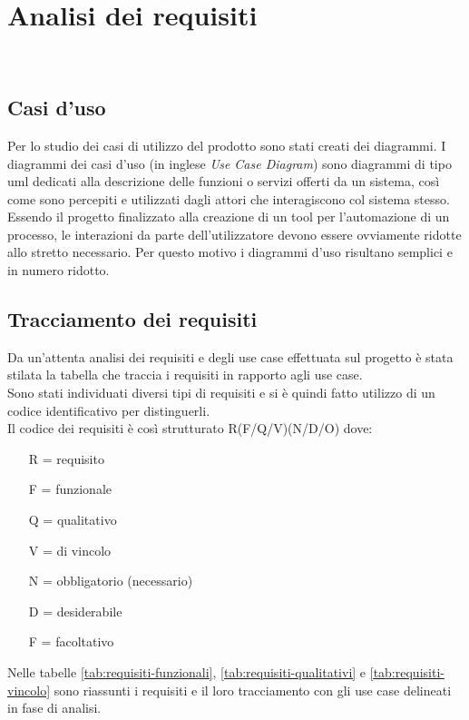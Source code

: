 
\chapter{Analisi dei requisiti}
\label{cap:analisi-requisiti}

\\

\section{Casi d'uso}

Per lo studio dei casi di utilizzo del prodotto sono stati creati dei diagrammi.
I diagrammi dei casi d'uso (in inglese \emph{Use Case Diagram}) sono diagrammi di tipo \gls{uml} dedicati alla descrizione delle funzioni o servizi offerti da un sistema, così come sono percepiti e utilizzati dagli attori che interagiscono col sistema stesso.
Essendo il progetto finalizzato alla creazione di un tool per l'automazione di un processo, le interazioni da parte dell'utilizzatore devono essere ovviamente ridotte allo stretto necessario. Per questo motivo i diagrammi d'uso risultano semplici e in numero ridotto.








\section{Tracciamento dei requisiti}

Da un'attenta analisi dei requisiti e degli use case effettuata sul progetto è stata stilata la tabella che traccia i requisiti in rapporto agli use case.\\
Sono stati individuati diversi tipi di requisiti e si è quindi fatto utilizzo di un codice identificativo per distinguerli.\\
Il codice dei requisiti è così strutturato R(F/Q/V)(N/D/O) dove:
\begin{enumerate}
  \item[R =] requisito
  \item[F =] funzionale
  \item[Q =] qualitativo
  \item[V =] di vincolo
  \item[N =] obbligatorio (necessario)
  \item[D =] desiderabile
  \item[F =] facoltativo
\end{enumerate}
Nelle tabelle \ref{tab:requisiti-funzionali}, \ref{tab:requisiti-qualitativi} e \ref{tab:requisiti-vincolo} sono riassunti i requisiti e il loro tracciamento con gli use case delineati in fase di analisi.

